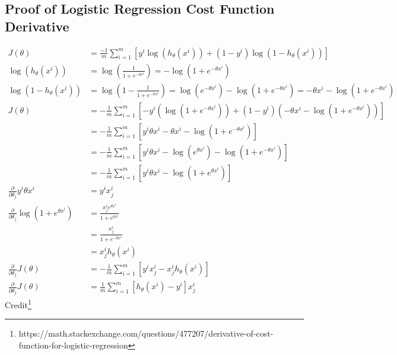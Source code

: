 \documentclass[11pt, oneside]{article}
\begin{document}
\subsection{Proof of Logistic Regression Cost Function Derivative}
	\begin{align*}
		J(\theta) &= \frac{-1}{m} \sum^m_{i=1} [y^i\log(h_\theta(x^i)) + (1-y^i)\log(1 - h_\theta(x^i))] \\
		\log(h_\theta(x^i)) &= \log(\frac{1}{1+e^{-\theta x^i}}) = -\log(1+e^{-\theta x^i})\\
		\log(1 - h_\theta(x^i)) &= \log(1-\frac{1}{1+e^{-\theta x^i}})=\log(e^{-\theta x^i})-\log(1+e^{-\theta x^i})=-\theta x^i-\log(1+e^{-\theta x^i})\\
		J(\theta) &= -\frac{1}{m}\sum_{i=1}^m \left[-y^i(\log(1+e^{-\theta x^i})) + (1-y^i)(-\theta x^i-\log(1+e^{-\theta x^i}))\right]\\
		&= -\frac{1}{m}\sum_{i=1}^m \left[y^i\theta x^i - \theta x^i - \log(1+e^{-\theta x^i})\right]\\
		&= -\frac{1}{m}\sum_{i=1}^m \left[y^i\theta x^i -\log(e^{\theta x^i}) - \log(1 + e^{-\theta x^i})\right]\\
		&=-\frac{1}{m}\sum_{i=1}^m \left[y^i\theta x^i - \log(1+e^{\theta x^i})\right]\\
		\frac{\partial}{\partial \theta_j}y^i\theta x^i &= y^i x^i_j\\
		\frac{\partial}{\partial \theta_j}\log(1+e^{\theta x^i}) &= \frac{x^i_je^{\theta x^i}}{1+e^{\theta x^i}}\\
		&= \frac{{x^i_j}}{{1+e^{-\theta x^i}}}\\
		&= x^i_jh_\theta(x^i)\\
		\frac{\partial}{\partial \theta_j}J(\theta) &= -\frac{1}{m}\sum_{i=1}^m \left[y^i x^i_j - x^i_jh_\theta(x^i)\right]\\
		\frac{\partial}{\partial \theta_j}J(\theta) &= \frac{1}{m}\sum_{i=1}^m \left[h_\theta(x^i) - y^i\right]x^i_j
	\end{align*}
	Credit\footnote{https://math.stackexchange.com/questions/477207/derivative-of-cost-function-for-logistic-regression}
\end{document}
